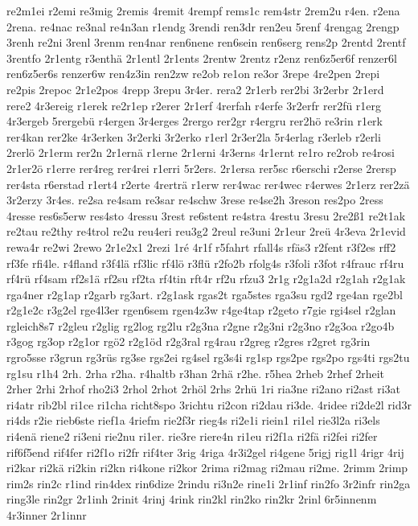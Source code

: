 {re2m1ei
r2emi
re3mig
2remis
4remit
4rempf
rems1c
rem4str
2rem2u
r4en.
r2ena
2rena.
re4nac
re3nal
re4n3an
r1endg
3rendi
ren3dr
ren2eu
5renf
4rengag
2rengp
3renh
re2ni
3renl
3renm
ren4nar
ren6nene
ren6sein
ren6serg
rens2p
2rentd
2rentf
3rentfo
2r1entg
r3enthä
2r1entl
2r1ents
2rentw
2rentz
r2enz
ren6z5er6f
renzer6l
ren6z5er6s
renzer6w
ren4z3in
ren2zw
re2ob
re1on
re3or
3repe
4re2pen
2repi
re2pis
2repoc
2r1e2pos
4repp
3repu
3r4er.
rera2
2r1erb
rer2bi
3r2erbr
2r1erd
rere2
4r3ereig
r1erek
re2r1ep
r2erer
2r1erf
4rerfah
r4erfe
3r2erfr
rer2fü
r1erg
4r3ergeb
5rergebü
r4ergen
3r4erges
2rergo
rer2gr
r4ergru
rer2hö
re3rin
r1erk
rer4kan
rer2ke
4r3erken
3r2erki
3r2erko
r1erl
2r3er2la
5r4erlag
r3erleb
r2erli
2rerlö
2r1erm
rer2n
2r1ernä
r1erne
2r1erni
4r3erns
4r1ernt
re1ro
re2rob
re4rosi
2r1er2ö
r1erre
rer4reg
rer4rei
r1erri
5r2ers.
2r1ersa
rer5sc
r6erschi
r2erse
2rersp
rer4sta
r6erstad
r1ert4
r2erte
4rerträ
r1erw
rer4wac
rer4wec
r4erwes
2r1erz
rer2zä
3r2erzy
3r4es.
re2sa
re4sam
re3sar
re4schw
3rese
re4se2h
3reson
res2po
2ress
4resse
res6s5erw
res4sto
4ressu
3rest
re6stent
re4stra
4restu
3resu
2re2ß1
re2t1ak
re2tau
re2thy
re4trol
re2u
reu4eri
reu3g2
2reul
re3uni
2r1eur
2reü
4r3eva
2r1evid
rewa4r
re2wi
2rewo
2r1e2x1
2rezi
1ré
4r1f
r5fahrt
rfall4s
rfäs3
r2fent
r3f2es
rff2
rf3fe
rfi4le.
r4fland
r3f4lä
rf3lic
rf4lö
r3flü
r2fo2b
rfolg4s
r3foli
r3fot
r4frauc
rf4ru
rf4rü
rf4sam
rf2s1ä
rf2su
rf2ta
rf4tin
rft4r
rf2u
rfzu3
2r1g
r2g1a2d
r2g1ah
r2g1ak
rga4ner
r2g1ap
r2garb
rg3art.
r2g1ask
rgas2t
rga5stes
rga3su
rgd2
rge4an
rge2bl
r2g1e2c
r3g2el
rge4l3er
rgen6sem
rgen4z3w
r4ge4tap
r2geto
r7gie
rgi4sel
r2glan
rgleich8s7
r2gleu
r2glig
rg2log
rg2lu
r2g3na
r2gne
r2g3ni
r2g3no
r2g3oa
r2go4b
r3gog
rg3op
r2g1or
rgö2
r2g1öd
r2g3ral
rg4rau
r2greg
r2gres
r2gret
rg3rin
rgro5sse
r3grun
rg3rüs
rg3se
rgs2ei
rg4sel
rg3s4i
rg1sp
rgs2pe
rgs2po
rgs4ti
rgs2tu
rg1su
r1h4
2rh.
2rha
r2ha.
r4haltb
r3han
2rhä
r2he.
r5hea
2rheb
2rhef
2rheit
2rher
2rhi
2rhof
rho2i3
2rhol
2rhot
2rhöl
2rhs
2rhü
1ri
ria3ne
ri2ano
ri2ast
ri3at
ri4atr
rib2bl
ri1ce
ri1cha
richt8spo
3richtu
ri2con
ri2dau
ri3de.
4ridee
ri2de2l
rid3r
ri4ds
r2ie
rieb6ste
rief1a
4riefm
rie2f3r
rieg4s
ri2e1i
riein1
ri1el
rie3l2a
ri3els
ri4enä
riene2
ri3eni
rie2nu
ri1er.
rie3re
riere4n
ri1eu
ri2f1a
ri2fä
ri2fei
ri2fer
rif6f5end
rif4fer
ri2f1o
ri2fr
rif4ter
3rig
4riga
4r3i2gel
ri4gene
5rigj
rig1l
4rigr
4rij
ri2kar
ri2kä
ri2kin
ri2kn
ri4kone
ri2kor
2rima
ri2mag
ri2mau
ri2me.
2rimm
2rimp
rim2s
rin2c
r1ind
rin4dex
rin6dize
2rindu
ri3n2e
rine1i
2r1inf
rin2fo
3r2infr
rin2ga
ring3le
rin2gr
2r1inh
2rinit
4rinj
4rink
rin2kl
rin2ko
rin2kr
2rinl
6r5innenm
4r3inner
2r1innr
}
